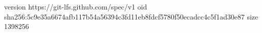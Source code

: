 version https://git-lfs.github.com/spec/v1
oid sha256:5c9e35a6674afb117b54a56394c3fd11eb8fdcf5780f50ecadcc4c5f1ad30e87
size 1398256
